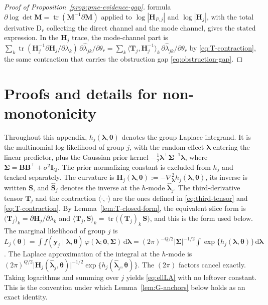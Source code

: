 \begin{proof}[Proof of Proposition~\ref{prop:pme-evidence-gap}]
formula $\partial\log\det\mathbf{M}=\operatorname{tr}(\mathbf{M}^{-1}\partial\mathbf{M})$ applied to $\log|\mathbf{H}_{P,j}|$ and $\log|\mathbf{H}_{j}|$, with the total derivative $\mathrm{D}_{r}$ collecting the direct channel and the mode channel, gives the stated expression. In the $\mathbf{H}_{j}$ trace, the mode-channel part is $\sum_{k}\operatorname{tr}(\mathbf{H}_{j}^{-1}\partial\mathbf{H}_{j}/\partial\lambda_{k})\,\partial\hat{\lambda}_{jk}/\partial\theta_{r}=\sum_{k}\big\langle\mathbf{T}_{j},\mathbf{H}_{j}^{-1}\big\rangle_{k}\,\partial\hat{\lambda}_{jk}/\partial\theta_{r}$ by \eqref{eq:T-contraction}, the same contraction that carries the obstruction gap \eqref{eq:obstruction-gap}.
\end{proof}

\section{Proofs and details for non-monotonicity}
\label{app:mm-proofs}

Throughout this appendix, $h_{j}(\bm{\lambda},\bm{\theta})$ denotes the group Laplace integrand. It is the multinomial log-likelihood of group $j$, with the random effect $\bm{\lambda}$ entering the linear predictor, plus the Gaussian prior kernel $-\frac{1}{2}\bm{\lambda}^{\top}\bm{\Sigma}^{-1}\bm{\lambda}$, where $\bm{\Sigma}=\mathbf{B}\mathbf{B}^{\top}+\sigma^{2}\mathbf{I}_{Q}$. The prior normalizing constant is excluded from $h_{j}$ and tracked separately. The curvature is $\mathbf{H}_{j}(\bm{\lambda},\bm{\theta}):=-\nabla^{2}_{\bm{\lambda}}h_{j}(\bm{\lambda},\bm{\theta})$, its inverse is written $\mathbf{S}$, and $\hat{\mathbf{S}}_{j}$ denotes the inverse at the $h$-mode $\hat{\bm{\lambda}}_{j}$. The third-derivative tensor $\mathbf{T}_{j}$ and the contraction $\big\langle\cdot,\cdot\big\rangle$ are the ones defined in \eqref{eq:third-tensor} and \eqref{eq:T-contraction}. By Lemma~\ref{lem:T-closed-form}, the equivalent slice form is $\big(\mathbf{T}_{j}\big)_{k}=\partial\mathbf{H}_{j}/\partial\lambda_{k}$ and $\big\langle\mathbf{T}_{j},\mathbf{S}\big\rangle_{k}=\operatorname{tr}\big((\mathbf{T}_{j})_{k}\,\mathbf{S}\big)$, and this is the form used below.
The marginal likelihood of group $j$ is $L_{j}(\bm{\theta})=\int f(\mathbf{y}_{j}\mid\bm{\lambda},\bm{\theta})\,\varphi(\bm{\lambda};\mathbf{0},\bm{\Sigma})\,\mathrm{d}\bm{\lambda}=(2\pi)^{-Q/2}|\bm{\Sigma}|^{-1/2}\int\exp\{h_{j}(\bm{\lambda},\bm{\theta})\}\,\mathrm{d}\bm{\lambda}$. The Laplace approximation of the integral at the $h$-mode is $(2\pi)^{Q/2}\big|\mathbf{H}_{j}(\hat{\bm{\lambda}}_{j},\bm{\theta})\big|^{-1/2}\exp\{h_{j}(\hat{\bm{\lambda}}_{j},\bm{\theta})\}$. The $(2\pi)$ factors cancel exactly. Taking logarithms and summing over $j$ yields \eqref{eq:ellLA} with no leftover constant. This is the convention under which Lemma~\ref{lem:G-anchors} below holds as an exact identity.

